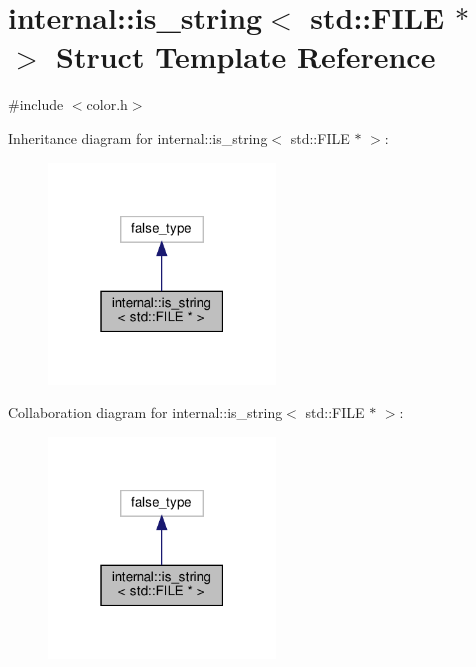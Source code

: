 \hypertarget{structinternal_1_1is__string_3_01std_1_1_f_i_l_e_01_5_01_4}{}\section{internal\+:\+:is\+\_\+string$<$ std\+:\+:F\+I\+LE $\ast$ $>$ Struct Template Reference}
\label{structinternal_1_1is__string_3_01std_1_1_f_i_l_e_01_5_01_4}


{\ttfamily \#include $<$color.\+h$>$}



Inheritance diagram for internal\+:\+:is\+\_\+string$<$ std\+:\+:F\+I\+LE $\ast$ $>$\+:
\nopagebreak
\begin{figure}[H]
\begin{center}
\leavevmode
\includegraphics[width=171pt]{structinternal_1_1is__string_3_01std_1_1_f_i_l_e_01_5_01_4__inherit__graph}
\end{center}
\end{figure}


Collaboration diagram for internal\+:\+:is\+\_\+string$<$ std\+:\+:F\+I\+LE $\ast$ $>$\+:
\nopagebreak
\begin{figure}[H]
\begin{center}
\leavevmode
\includegraphics[width=171pt]{structinternal_1_1is__string_3_01std_1_1_f_i_l_e_01_5_01_4__coll__graph}
\end{center}
\end{figure}


